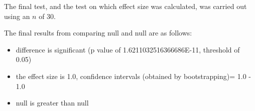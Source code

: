\documentclass[]{article}
\begin{document}
The final test, and the test on which effect size was calculated, was carried out using an $n$ of 30. 

The final results from comparing null and null are as follows:
\begin{itemize}
\item{difference is significant (p value of 1.6211032516366686E-11, threshold of 0.05)}
\item{the effect size is 1.0, confidence intervals (obtained by bootstrapping)= 1.0 - 1.0}
\item{null is greater than null}
\end{itemize}
\end{document}
